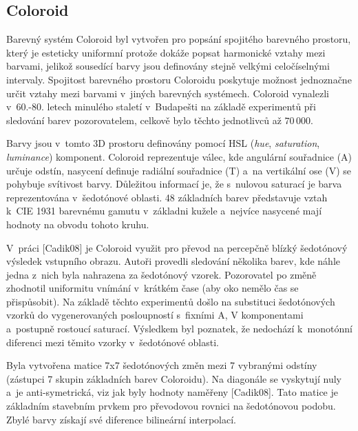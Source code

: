 \documentclass[11pt,a4paper,oneside]{article}
\begin{document}
	\subsection{Coloroid}
	Barevný systém Coloroid byl vytvořen pro popsání spojitého barevného prostoru,
	který je esteticky uniformní protože dokáže popsat harmonické vztahy mezi barvami,
	jelikož sousedící barvy jsou definovány stejně velkými celočíselnými intervaly.
	Spojitost barevného prostoru Coloroidu poskytuje možnost jednoznačne určit
	vztahy mezi barvami v~jiných barevných systémech. Coloroid vynalezli v~60.-80. letech
	minulého staletí v~Budapešti na základě experimentů při sledování barev pozorovatelem,
	celkově bylo těchto jednotlivců až $70\,000$.

	Barvy jsou v~tomto 3D prostoru definovány pomocí HSL (\emph{hue}, \emph{saturation},
	\emph{luminance}) komponent. Coloroid reprezentuje válec, kde angulární souřadnice
	(A) určuje odstín, nasycení definuje radiální souřadnice (T) a~na vertikální ose (V)
	se pohybuje svítivost barvy. Důležitou informací je, že s~nulovou saturací je barva
	reprezentována v~šedotónové oblasti. 48 základních barev představuje vztah k~CIE 1931
	barevnému gamutu v~základni kužele a~nejvíce nasycené mají hodnoty na obvodu tohoto kruhu.

	V~práci [Cadik08] je Coloroid využit pro převod na percepčně blízký šedotónový výsledek
	vstupního obrazu. Autoři provedli sledování několika barev, kde náhle jedna z~nich byla
	nahrazena za šedotónový vzorek. Pozorovatel po změně zhodnotil uniformitu vnímání v~krátkém
	čase (aby oko nemělo čas se přispůsobit). Na základě těchto experimentů došlo na
	substituci šedotónových vzorků do vygenerovaných posloupností s~fixními A, V komponentami
	a~postupně rostoucí saturací. Výsledkem byl poznatek, že nedochází k~monotónní diferenci mezi
	těmito vzorky v~šedotónové oblasti.

	Byla vytvořena matice 7x7 šedotónových změn mezi 7 vybranými odstíny (zástupci 7 skupin
	základních barev Coloroidu). Na diagonále se vyskytují nuly a~je anti-symetrická, viz
	jak byly hodnoty naměřeny [Cadik08]. Tato matice je základním stavebním prvkem pro převodovou
	rovnici na šedotónovou podobu. Zbylé barvy získají své diference bilineární interpolací.
\end{document}
